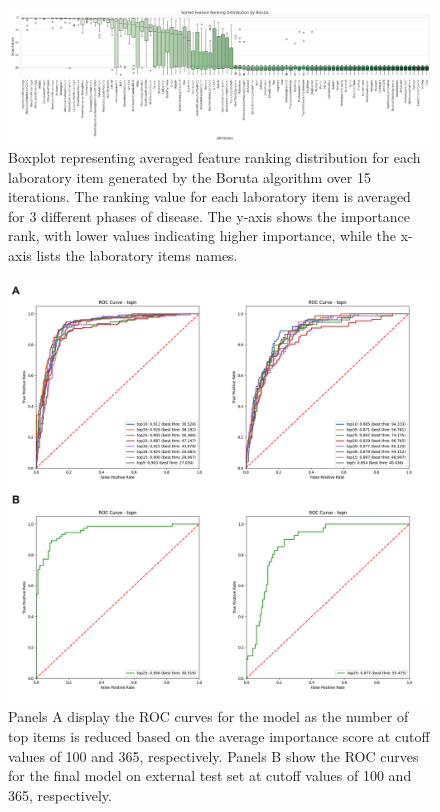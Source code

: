 \documentclass[final,3p,times,authoryear]{elsarticle}
\begin{document}
\begin{figure}[t] 
    \centering
    \includegraphics[width=0.8\linewidth]{figures/boruta_by_group.png} 
    \caption{Boxplot representing averaged feature ranking distribution for each laboratory item generated by the Boruta algorithm over 15 iterations. The ranking value for each laboratory item is averaged for 3 different phases of disease. The y-axis shows the importance rank, with lower values indicating higher importance, while the x-axis lists the laboratory items names.}\label{boruta_by_group}
\end{figure}


\begin{figure}[t]  
    \centering 
    \includegraphics[width=0.8\linewidth]{figures/extvaltopn.png} 
    \caption{Panels A display the ROC curves for the model as the number of top items is reduced based on the average importance score at cutoff values of 100 and 365, respectively. Panels B show the ROC curves for the final model on external test set at cutoff values of 100 and 365, respectively.}\label{topn_extval25}

\end{figure}
\end{document}
